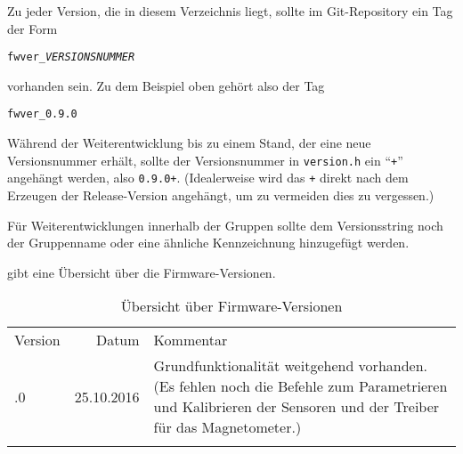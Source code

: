 Zu jeder Version, die in diesem Verzeichnis liegt, sollte im Git-Repository ein Tag der Form
\begin{center}
	\texttt{fwver\_\textit{VERSIONSNUMMER}}
\end{center}
vorhanden sein. Zu dem Beispiel oben gehört also der Tag
\begin{center}
	\texttt{fwver\_0.9.0}
\end{center}

Während der Weiterentwicklung bis zu einem Stand, der eine neue Versionsnummer erhält, sollte der Versionsnummer in \verb|version.h| ein "`\verb|+|"' angehängt werden, also \zB \verb|0.9.0+|. (Idealerweise wird das \verb|+| direkt nach dem Erzeugen der Release-Version angehängt, um zu vermeiden dies zu vergessen.)

Für Weiterentwicklungen innerhalb der Gruppen sollte dem Versionsstring noch der Gruppenname oder eine ähnliche Kennzeichnung hinzugefügt werden.


 gibt eine Übersicht über die Firmware-Versionen.

\begin{table}%
	\centering
	\caption{Übersicht über Firmware-Versionen}
	\label{tab:repo:fw_versions}
	\begin{tabular}{lrp{10cm}}
		\mytoprule
		Version & Datum & Kommentar \\
		\mymidrule
		0.9.0
			& 25.10.2016
			& Grundfunktionalität weitgehend vorhanden. (Es fehlen noch die Befehle zum Parametrieren und Kalibrieren der Sensoren und der Treiber für das Magnetometer.) \\
		\mybottomrule
	\end{tabular}
\end{table}
